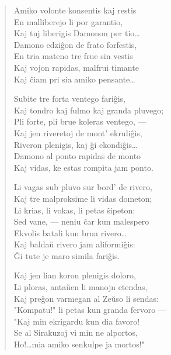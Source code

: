 \begin{verse}
                  Amiko volonte konsentis kaj restis\\
                  En malliberejo li por garantio,\\
                  Kaj tuj liberigis Damonon per tio\dots\\
                  Damono edzi\^gon de frato forfestis,\\
                  En tria mateno tre frue sin vestis\\
                  Kaj vojon rapidas, malfrui timante\\
                  Kaj \^ciam pri sia amiko pensante\dots

                  Subite tre forta ventego fari\^gis,\\
                  Kaj tondro kaj fulmo kaj granda pluvego;\\
                  Pli forte, pli brue koleras ventego, ---\\
                  Kaj jen riveretoj de mont' ekruli\^gis,\\
                  Riveron plenigis, kaj \^gi ekondi\^gis\dots\\
                  Damono al ponto rapidas de monto\\
                  Kaj vidas, ke estas rompita jam ponto.

                  Li vagas sub pluvo sur bord' de rivero,\\
                  Kaj tre malproksime li vidas dometon;\\
                  Li krias, li vokas, li petas \^sipeton:\\
                  Sed vane, --- neniu \^car kun malespero\\
                  Ekvolis batali kun brua rivero\dots\\
                  Kaj balda\u u rivero jam aliformi\^gis:\\
                  \^Gi tute je maro simila fari\^gis.

                  Kaj jen lian koron plenigis doloro,\\
                  Li ploras, anta\u uen li manojn etendas,\\
                  Kaj pre\^gon varmegan al Ze\u uso li sendas:\\
                  "Kompatu!" li petas kun granda fervoro ---\\
                  "Kaj min ekrigardu kun dia favoro!\\
                  Se al Sirakuzoj vi min ne alportos,\\
                  Ho!\dots mia amiko senkulpe ja mortos!"


\end{verse}
